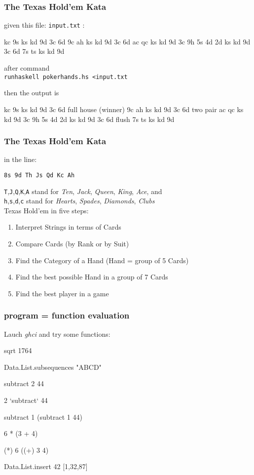 \documentclass[12pt,xcolor={dvipsnames}]{beamer}
\newcommand{\tc}{\textcolor}
\newcommand{\key}[1]{\tc{orange}{#1}}
\newcommand{\rk}{\enskip{\key{$\hookleftarrow$}}}
\newcommand{\vs}{\vspace{1em}}
\begin{document}
\begin{frame}[fragile]
\frametitle{The Texas Hold'em Kata}
given this file: \texttt{input.txt} :
\begin{term}
    kc 9s ks kd 9d 3c 6d 
    9c ah ks kd 9d 3c 6d
    ac qc ks kd 9d 3c 
    9h 5s 
    4d 2d ks kd 9d 3c 6d
    7s ts ks kd 9d
\end{term}
after command\\ \texttt{runhaskell pokerhands.hs <input.txt}

then the output is
\begin{term}
    kc 9s ks kd 9d 3c 6d full house (winner)
    9c ah ks kd 9d 3c 6d two pair
    ac qc ks kd 9d 3c 
    9h 5s 
    4d 2d ks kd 9d 3c 6d flush
    7s ts ks kd 9d
\end{term}
\end{frame}
\begin{frame}[fragile]
\frametitle{The Texas Hold'em Kata}

in the line:\\
\begin{center}
\texttt{8s 9d Th Js Qd Kc Ah}
\end{center}
\texttt{T},\texttt{J},\texttt{Q},\texttt{K},\texttt{A} stand for \emph{Ten}, \emph{Jack}, \emph{Queen}, \emph{King}, \emph{Ace}, and\\
\texttt{h},\texttt{s},\texttt{d},\texttt{c} stand for \emph{Hearts}, \emph{Spades}, \emph{Diamonds}, \emph{Clubs}\\
\vs
Texas Hold'em in five steps:
\begin{enumerate}
\item Interpret Strings in terms of Cards
\item Compare Cards (by Rank or by Suit)
\item Find the Category of a Hand (Hand = group of 5 Cards)
\item Find the best possible Hand in a group of 7 Cards
\item Find the best player in a game
\end{enumerate}
\end{frame}
\begin{frame}[fragile]
\frametitle{program = function evaluation}
Lauch \emph{ghci} and try some functions:
\begin{term}
sqrt 1764\rk

Data.List.subsequences "ABCD"\rk

subtract 2 44\rk

 2 `subtract` 44\rk

subtract 1 (subtract 1 44)\rk

6 * (3 + 4)\rk

(*) 6 ((+) 3 4)\rk

Data.List.insert 42 [1,32,87]\rk
\end{term}
\end{frame}
\end{document}
